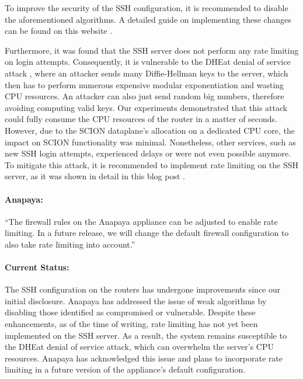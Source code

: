 To improve the security of the SSH configuration, it is recommended to disable the aforementioned algorithms.
A detailed guide on implementing these changes can be found on this website \cite{sshauditHardeningGuides}.


Furthermore, it was found that the SSH server does not perform any rate limiting on login attempts.
Consequently, it is vulnerable to the DHEat denial of service attack \cite{dheatAttack}, where an attacker sends many Diffie-Hellman keys to the server, which then has to perform numerous expensive modular exponentiation and wasting CPU resources.
An attacker can also just send random big numbers, therefore avoiding computing valid keys.
Our experiments demonstrated that this attack could fully consume the CPU resources of the router in a matter of seconds.
However, due to the SCION dataplane's allocation on a dedicated CPU core, the impact on SCION functionality was minimal.
Nonetheless, other services, such as new SSH login attempts, experienced delays or were not even possible anymore.
To mitigate this attack, it is recommended to implement rate limiting on the SSH server, as it was shown in detail in this blog post \cite{dheatAnalysis}.

\begin{boxH}
\paragraph{Anapaya:}
``The firewall rules on the Anapaya appliance can be adjusted to enable rate limiting. In a future release, we will change the default firewall configuration to also take rate limiting into account.''
\end{boxH}

\paragraph{Current Status:}
The SSH configuration on the routers has undergone improvements since our initial disclosure.
Anapaya has addressed the issue of weak algorithms by disabling those identified as compromised or vulnerable.
Despite these enhancements, as of the time of writing, rate limiting has not yet been implemented on the SSH server.
As a result, the system remains susceptible to the DHEat denial of service attack, which can overwhelm the server's CPU resources.
Anapaya has acknowledged this issue and plans to incorporate rate limiting in a future version of the appliance's default configuration.


